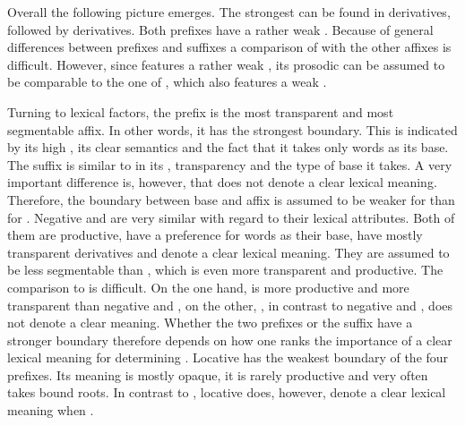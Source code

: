 Overall the following picture emerges. The strongest  can be found in derivatives, followed by derivatives. Both prefixes have a rather weak . Because of general differences between prefixes and suffixes a comparison of  with the other affixes is difficult. However, since  features a rather weak , its prosodic  can be assumed to be comparable to the one of , which also features a weak .



Turning to lexical factors, the prefix  is the most transparent and most segmentable affix. In other words, it has the strongest boundary. This is indicated by its high , its clear semantics and the fact that it takes only words as its base. The suffix  is similar to  in its , transparency and the type of base it takes. A very important difference is, however, that  does not denote a clear lexical meaning. Therefore, the boundary between base and affix is assumed to be weaker for  than for  . 
Negative  and  are very similar with regard to their lexical attributes. Both of them are productive, have a preference for words as their base, have mostly transparent derivatives and denote a clear lexical meaning. They are assumed to be less segmentable than , which is even more transparent and productive. The comparison to  is difficult. On the one hand,  is more productive and more transparent than negative  and , on the other, , in contrast to negative  and , does not denote a clear meaning. Whether the two prefixes or the suffix have a stronger boundary therefore depends on how one ranks the importance of a clear lexical meaning for determining . Locative  has the weakest boundary of the four prefixes. Its meaning is mostly opaque, it is rarely productive and very often takes bound roots. In contrast to , locative  does, however, denote a clear lexical meaning when .


